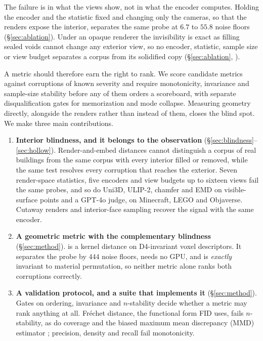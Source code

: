 The failure is in what the views show, not in what the encoder computes.
Holding the encoder and the statistic fixed and changing only the cameras, so
that the renders expose the interior, separates the same probe at $6.7$ to $55.8$
noise floors (\S\ref{sec:ablation}). Under an opaque renderer the invisibility
is exact as filling sealed voids cannot change any
exterior view, so no encoder, statistic, sample size or view budget separates a
corpus from its solidified copy (\S\ref{sec:ablation},
).

 A metric should therefore earn the right to rank. We score candidate metrics
against corruptions of known severity and require monotonicity, invariance and
sample-size stability before any of them orders a scoreboard, with separate
disqualification gates for memorization and mode collapse. Measuring geometry
directly, alongside the renders rather than instead of them, closes the blind
spot. We make three main contributions.

\begin{enumerate}[leftmargin=*,itemsep=1pt,topsep=2pt]

\item \textbf{Interior blindness, and it belongs to the observation}
(\S\ref{sec:blindness}--\ref{sec:hollow}). Render-and-embed distances cannot
distinguish a corpus of real buildings from the same corpus with every interior
filled or removed, while the same test resolves every corruption that reaches the exterior.
Seven render-space statistics, five encoders and view budgets up to sixteen views fail the
same probes, and so do Uni3D, ULIP-2, chamfer and EMD on visible-surface points and a
GPT-4o judge, on Minecraft, LEGO and Objaverse. Cutaway renders and interior-face sampling
recover the signal with the same encoder.

\item \textbf{A geometric metric with the complementary blindness}
(\S\ref{sec:method}). \vkid{} is a kernel distance on D4-invariant voxel
descriptors. It separates the probe by $444$ noise floors, needs no GPU, and is
\emph{exactly} invariant to material permutation, so neither metric alone ranks
both corruptions correctly.

\item \textbf{A validation protocol, and a suite that implements it}
(\S\ref{sec:method}). Gates on ordering, invariance and $n$-stability decide
whether a metric may rank anything at all. Fr\'echet distance, the functional form FID
uses, fails $n$-stability, as do coverage and the biased maximum mean discrepancy
(MMD) estimator \citep{jayasumana2024cmmd}; precision, density and recall
\citep{naeem2020prdc,kynkaanniemi2019precision} fail monotonicity.

\end{enumerate}
